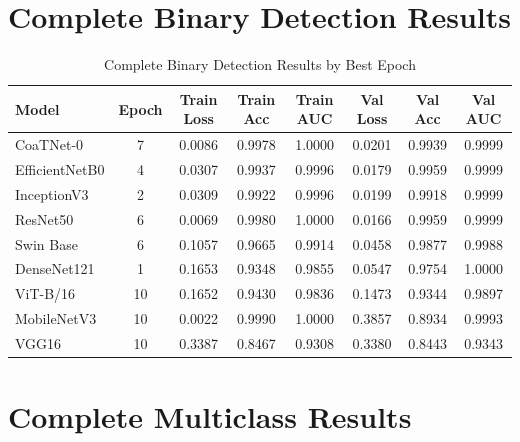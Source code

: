\documentclass[final,3p,times,number]{elsarticle}
\begin{document}
\FloatBarrier
\appendix
\renewcommand{\thetable}{\Alph{section}.\arabic{table}}

\section{Complete Binary Detection Results}
\setcounter{table}{0}

\begin{table}[H]
\centering
\caption{Complete Binary Detection Results by Best Epoch}
\label{tab:complete-binary-results}
\scriptsize
\begin{tabular*}{\textwidth}{@{\extracolsep{\fill}}lccccccc@{}}
\toprule
Model & Epoch & Train Loss & Train Acc & Train AUC & Val Loss & Val Acc & Val AUC \\
\midrule
CoaTNet-0 & 7 & 0.0086 & 0.9978 & 1.0000 & 0.0201 & 0.9939 & 0.9999 \\
EfficientNetB0 & 4 & 0.0307 & 0.9937 & 0.9996 & 0.0179 & 0.9959 & 0.9999 \\
InceptionV3 & 2 & 0.0309 & 0.9922 & 0.9996 & 0.0199 & 0.9918 & 0.9999 \\
ResNet50 & 6 & 0.0069 & 0.9980 & 1.0000 & 0.0166 & 0.9959 & 0.9999 \\
Swin Base & 6 & 0.1057 & 0.9665 & 0.9914 & 0.0458 & 0.9877 & 0.9988 \\
DenseNet121 & 1 & 0.1653 & 0.9348 & 0.9855 & 0.0547 & 0.9754 & 1.0000 \\
ViT-B/16 & 10 & 0.1652 & 0.9430 & 0.9836 & 0.1473 & 0.9344 & 0.9897 \\
MobileNetV3 & 10 & 0.0022 & 0.9990 & 1.0000 & 0.3857 & 0.8934 & 0.9993 \\
VGG16 & 10 & 0.3387 & 0.8467 & 0.9308 & 0.3380 & 0.8443 & 0.9343 \\
\bottomrule
\end{tabular*}
\end{table}
\FloatBarrier

\section{Complete Multiclass Results}
\setcounter{table}{0}
\end{document}
